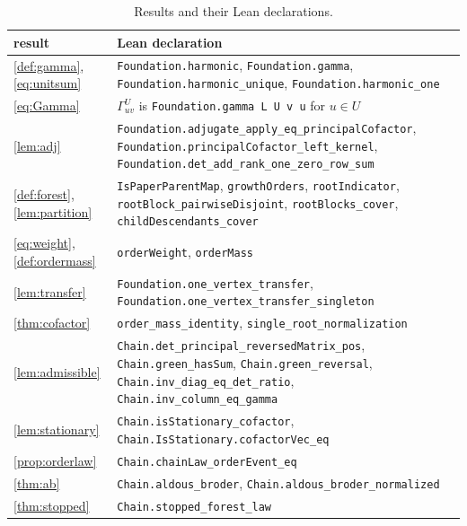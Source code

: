 \documentclass[onefignum,onetabnum]{siamart250211}
\numberwithin{theorem}{section}
\numberwithin{equation}{section}
\begin{document}
\begin{table}[ht]
\caption{Results and their Lean declarations.}\label{tab:lean}
\centering
\footnotesize
\begin{tabular}{@{}>{\raggedright\arraybackslash}p{3.3cm}>{\raggedright\arraybackslash}p{8.4cm}@{}}
\toprule
result & Lean declaration \\
\midrule
\cref{def:gamma}, \eqref{eq:unitsum} & \texttt{Foundation.harmonic}, \texttt{Foundation.gamma}, \texttt{Foundation.harmonic\_unique}, \texttt{Foundation.harmonic\_one} \\
\eqref{eq:Gamma} & $\Gamma^U_{uv}$ is \texttt{Foundation.gamma L U v u} for $u\in U$ \\
\cref{lem:adj} & \texttt{Foundation.adjugate\_apply\_eq\_principalCofactor}, \texttt{Foundation.principalCofactor\_left\_kernel}, \texttt{Foundation.det\_add\_rank\_one\_zero\_row\_sum} \\
\cref{def:forest}, \cref{lem:partition} & \texttt{IsPaperParentMap}, \texttt{growthOrders}, \texttt{rootIndicator}, \texttt{rootBlock\_pairwiseDisjoint}, \texttt{rootBlocks\_cover}, \texttt{childDescendants\_cover} \\
\eqref{eq:weight}, \cref{def:ordermass} & \texttt{orderWeight}, \texttt{orderMass} \\
\cref{lem:transfer} & \texttt{Foundation.one\_vertex\_transfer}, \texttt{Foundation.one\_vertex\_transfer\_singleton} \\
\cref{thm:cofactor} & \texttt{order\_mass\_identity}, \texttt{single\_root\_normalization} \\
\cref{lem:admissible} & \texttt{Chain.det\_principal\_reversedMatrix\_pos}, \texttt{Chain.green\_hasSum}, \texttt{Chain.green\_reversal}, \texttt{Chain.inv\_diag\_eq\_det\_ratio}, \texttt{Chain.inv\_column\_eq\_gamma} \\
\cref{lem:stationary} & \texttt{Chain.isStationary\_cofactor}, \texttt{Chain.IsStationary.cofactorVec\_eq} \\
\cref{prop:orderlaw} & \texttt{Chain.chainLaw\_orderEvent\_eq} \\
\cref{thm:ab} & \texttt{Chain.aldous\_broder}, \texttt{Chain.aldous\_broder\_normalized} \\
\cref{thm:stopped} & \texttt{Chain.stopped\_forest\_law} \\
\bottomrule
\end{tabular}
\end{table}
\end{document}
